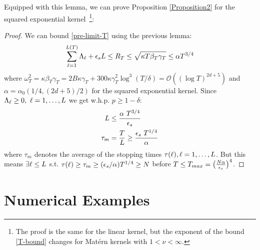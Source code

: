 Equipped with this lemma, we can prove Proposition \ref{Proposition2} for the squared exponential kernel~\footnote{The proof is the same for the linear kernel, but the exponent of the bound \eqref{T-bound} changes for Mat\'{e}rn kernels with $1 < \nu < \infty$.}:
\begin{proof}
We can bound \eqref{pre-limit-T} using the previous lemma:
\begin{align}
\sum_{\ell=1}^{L(T)}\Lambda_\ell + \epsilon_s L \leq R_{T} \leq \sqrt{\kappa T \beta_{T} \gamma_{T}} \leq \alpha T^{3/4} \label{T-bound}
\end{align}
where $\omega_T^2 = \kappa\beta_T\gamma_T = 2B\kappa\gamma_T + 300\kappa\gamma_T^2\log^{3}(T/\delta) = \mathcal{O}((\log T)^{2d+5})$ and $\alpha = \alpha_0(1/4,(2d+5)/2)$ for the squared exponential kernel. Since $\Lambda_\ell \geq 0, \ \ell = 1, \ldots, L$ we get w.h.p. $p \geq 1 - \delta$:
\begin{align}
\numepisode &\leq \frac{\alpha \ T^{3/4}}{\threshold} \\
\tau_m &= \frac{T}{\numepisode} \geq \frac{\threshold \ T^{1/4}}{\alpha}
\end{align}
where $\tau_m$ denotes the average of the stopping times $\tau(\ell), \ell = 1, \ldots, L$. But this means $\exists \ell \leq L$ s.t. $\tau(\ell) \geq \tau_m \geq (\epsilon_s/\alpha)T^{1/4} \geq N$ before $T \leq T_{max} = \big(\frac{N\alpha}{\epsilon_s}\big)^{4}$.
\end{proof}

\section{Numerical Examples}

